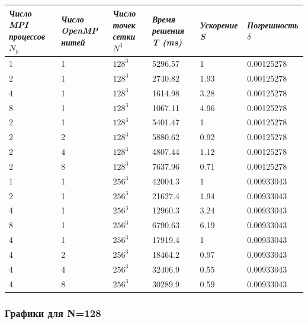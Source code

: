 \documentclass[a4paper,hidelinks,12pt]{article}
\begin{document}
{
\centering
\noindent\begin{tabular}{|p{2cm}|p{2cm}|p{2.5cm}|p{2.5cm}|p{2cm}|p{2.5cm}|}
    \hline
    \textit{Число MPI процессов }$N_p$ & \textit{Число OpenMP нитей} & \textit{Число точек сетки }$N^3$ & \textit{Время решения T (ms)} & \textit{Ускорение S} & \textit{Погрешность }$\delta$ \\
    \hline
    1 & 1 & $128^3$ & 5296.57 & 1 & 0.00125278 \\
    2 & 1 & $128^3$ & 2740.82 & 1.93 & 0.00125278 \\
    4 & 1 & $128^3$ & 1614.98 & 3.28 & 0.00125278 \\
    8 & 1 & $128^3$ & 1067.11 & 4.96 & 0.00125278 \\
    \hline
    2 & 1 & $128^3$ & 5401.47 & 1 & 0.00125278 \\
    2 & 2 & $128^3$ & 5880.62 & 0.92 & 0.00125278 \\
    2 & 4 & $128^3$ & 4807.44 & 1.12 & 0.00125278 \\
    2 & 8 & $128^3$ & 7637.96 & 0.71 & 0.00125278 \\
    \hline
    \hline
    1 & 1 & $256^3$ & 42004.3 & 1 & 0.00933043 \\
    2 & 1 & $256^3$ & 21627.4 & 1.94 & 0.00933043 \\
    4 & 1 & $256^3$ & 12960.3 & 3.24 & 0.00933043 \\
    8 & 1 & $256^3$ & 6790.63 & 6.19 & 0.00933043 \\
    \hline
    4 & 1 & $256^3$ & 17919.4 & 1 & 0.00933043 \\
    4 & 2 & $256^3$ & 18464.2 & 0.97 & 0.00933043 \\
    4 & 4 & $256^3$ & 32406.9 & 0.55 & 0.00933043 \\
    4 & 8 & $256^3$ & 30289.9 & 0.59 & 0.00933043 \\
    \hline
    
\end{tabular}
}



\subsubsection{Графики для N=128}
\end{document}
